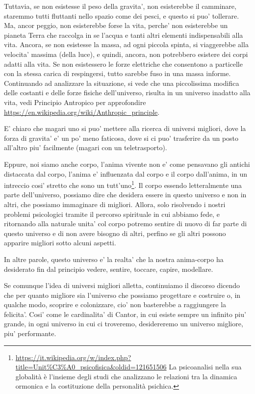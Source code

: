 Tuttavia, se non esistesse il peso della gravita', non esisterebbe il camminare, staremmo tutti fluttanti nello spazio come dei pesci, e questo si puo' tollerare. Ma, ancor peggio, non esisterebbe forse la vita, perche' non esisterebbe un pianeta Terra che raccolga in se l'acqua e tanti altri elementi indispensabili alla vita. Ancora, se non esistesse la massa, ad ogni piccola spinta, si viaggerebbe alla velocita' massima (della luce), e quindi, ancora, non potrebbero esistere dei corpi adatti alla vita. Se non esistessero le forze elettriche che consentono a particelle con la stessa carica di respingersi, tutto sarebbe fuso in una massa informe. Continuando ad analizzare la situazione, si vede che una piccolissima modifica delle costanti e delle forze fisiche dell'universo, risulta in un universo inadatto alla vita, vedi Principio Antropico per approfondire \url{https://en.wikipedia.org/wiki/Anthropic\_principle}.

E' chiaro che magari uno si puo' mettere alla ricerca di universi migliori, dove la forza di gravita' e' un po' meno faticosa, dove si ci puo' trasferire da un posto all'altro piu' facilmente (magari con un teletrasporto).

Eppure, noi siamo anche corpo, l'anima vivente non e' come pensavano gli antichi distaccata dal corpo, l'anima e' influenzata dal corpo e il corpo dall'anima, in un intreccio cosi' stretto che sono un tutt'uno\footnote{
    \url{https://it.wikipedia.org/w/index.php?title=Unit\%C3\%A0\_psicofisica&oldid=121651506}
    La psicoanalisi nella sua globalità è l'insieme degli studi che analizzano le relazioni tra la dinamica ormonica e la costituzione della personalità psichica. 
}. Il corpo essendo letteralmente una parte dell'universo, possiamo dire che desidera essere in questo universo e non in altri, che possiamo immaginare di migliori. Allora, solo risolvendo i nostri problemi psicologici tramite il percorso spirituale in cui abbiamo fede, e ritornando alla naturale unita' col corpo potremo sentire di nuovo di far parte di questo universo e di non avere bisogno di altri, perfino se gli altri possono apparire migliori sotto alcuni aspetti.

In altre parole, questo universo e' la realta' che la nostra anima-corpo ha desiderato fin dal principio vedere, sentire, toccare, capire, modellare. 

Se comunque l'idea di universi migliori alletta, continuiamo il discorso dicendo che per quanto migliore sia l'universo che possiamo progettare e costruire o, in qualche modo, scoprire e colonizzare, cio' non basterebbe a raggiungere la felicita'. Cosi' come le cardinalita' di Cantor, in cui esiste sempre un infinito piu' grande, in ogni universo in cui ci troveremo, desidereremo un universo migliore, piu' performante.

